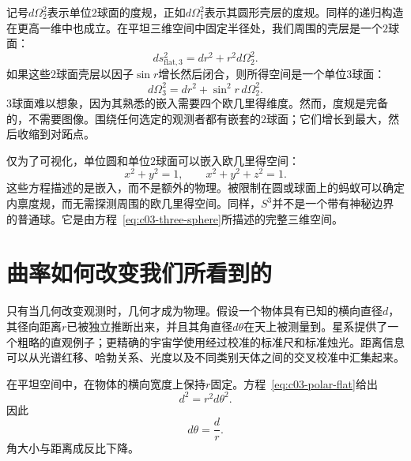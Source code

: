 记号\(d\Omega_2^2\)表示单位\(2\)球面的度规，正如\(d\Omega_1^2\)表示其圆形壳层的度规。同样的递归构造在更高一维中也成立。在平坦三维空间中固定半径处，我们周围的壳层是一个\(2\)球面：
\begin{equation}
ds_{\text{flat},3}^2 = dr^2 + r^2 d\Omega_2^2.
\label{eq:c03-flat-three-polar}
\end{equation}
如果这些\(2\)球面壳层以因子\(\sin r\)增长然后闭合，则所得空间是一个单位\(3\)球面：
\begin{equation}
d\Omega_3^2 = dr^2 + \sin^2 r\, d\Omega_2^2.
\label{eq:c03-three-sphere}
\end{equation}
\(3\)球面难以想象，因为其熟悉的嵌入需要四个欧几里得维度。然而，度规是完备的，不需要图像。围绕任何选定的观测者都有嵌套的\(2\)球面；它们增长到最大，然后收缩到对跖点。

\begin{classroomqa}
\end{classroomqa}

仅为了可视化，单位圆和单位\(2\)球面可以嵌入欧几里得空间：
\begin{equation}
x^2+y^2=1,
\qquad
x^2+y^2+z^2=1.
\end{equation}
这些方程描述的是嵌入，而不是额外的物理。被限制在圆或球面上的蚂蚁可以确定内禀度规，而无需探测周围的欧几里得空间。同样，\(S^3\)并不是一个带有神秘边界的普通球。它是由方程~\eqref{eq:c03-three-sphere}所描述的完整三维空间。

\section{曲率如何改变我们所看到的}

只有当几何改变观测时，几何才成为物理。假设一个物体具有已知的横向直径\(d\)，其径向距离\(r\)已被独立推断出来，并且其角直径\(d\theta\)在天上被测量到。星系提供了一个粗略的直观例子；更精确的宇宙学使用经过校准的标准尺和标准烛光。距离信息可以从光谱红移、哈勃关系、光度以及不同类别天体之间的交叉校准中汇集起来。

在平坦空间中，在物体的横向宽度上保持\(r\)固定。方程~\eqref{eq:c03-polar-flat}给出
\begin{equation}
d^2 = r^2 d\theta^2.
\label{eq:c03-flat-angle-step}
\end{equation}
因此
\begin{equation}
d\theta = \frac{d}{r}.
\label{eq:c03-flat-angle}
\end{equation}
角大小与距离成反比下降。

